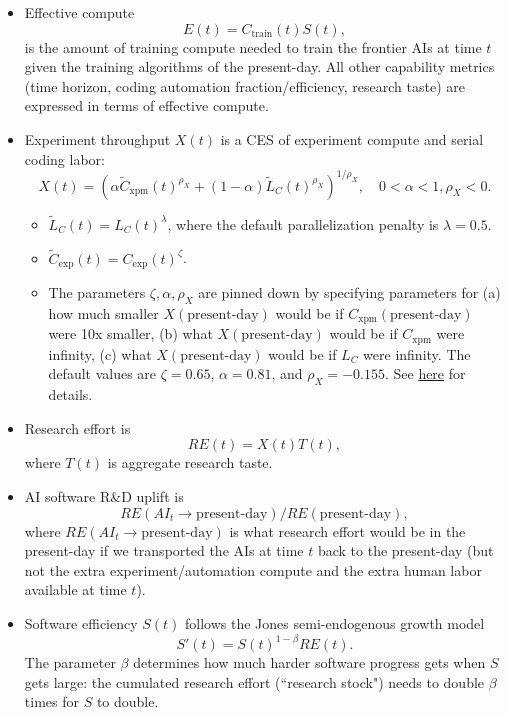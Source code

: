 \documentclass{article}
\theoremstyle{definition}
\begin{document}
\begin{itemize}
\item Effective compute
\[E(t) = C_{\text{train}}(t) S(t),\]
is the amount of training compute needed to train the frontier AIs at time $t$ given the training algorithms of the present-day. All other capability metrics (time horizon, coding automation fraction/efficiency, research taste) are expressed in terms of effective compute.
\item Experiment throughput $X(t)$ is a CES of experiment compute and serial coding labor:
\[ X(t) = \left( \alpha \tilde{C}_\text{xpm}(t)^{\rho_X} + (1-\alpha) \tilde{L}_C(t)^{\rho_X} \right)^{1/\rho_X}, \quad 0 < \alpha < 1, \rho_X < 0.\]
\begin{itemize}
\item $\tilde{L}_C(t) = L_C(t)^{\lambda}$, where the default parallelization penalty is $\lambda = 0.5$.
\item $\tilde{C}_\text{exp}(t) = C_\text{exp}(t)^\zeta$.
\item The parameters $\zeta, \alpha, \rho_X$ are pinned down by specifying parameters for (a) how much smaller $X(\text{present-day})$ would be if $C_\text{xpm}(\text{present-day})$ were 10x smaller, (b) what $X(\text{present-day})$ would be if $C_\text{xpm}$ were infinity, (c) what $X(\text{present-day})$ would be if $L_C$ were infinity. The default values are $\zeta = 0.65$, $\alpha = 0.81$, and $\rho_X = -0.155$. See \href{https://docs.google.com/document/d/1ru6Okbxb6XuH18Cz8439sdQJazMV39hNxsWDokh97r0/edit?tab=t.0#bookmark=id.z11wqimj4fl4}{here} for details.
\end{itemize}
\item Research effort is
\[RE(t) = X(t) T(t),\]
where $T(t)$ is aggregate research taste.
\item AI software R\&D uplift is
\[RE(AI_t \rightarrow \text{present-day})/RE(\text{present-day}),\]
where $RE(AI_t \rightarrow \text{present-day})$ is what research effort would be in the present-day if we transported the AIs at time $t$ back to the present-day (but not the extra experiment/automation compute and the extra human labor available at time $t$).
\item Software efficiency $S(t)$ follows the Jones semi-endogenous growth model
\[S'(t) = S(t)^{1-\beta} RE(t).\]
The parameter $\beta$ determines how much harder software progress gets when $S$ gets large: the cumulated research effort (``research stock") needs to double $\beta$ times for $S$ to double. 
\end{itemize}
\end{document}
